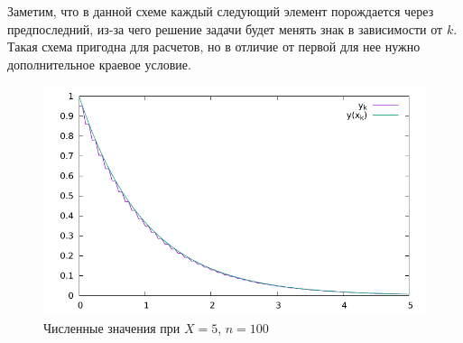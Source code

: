 \begin{example}
\begin{enumerate}
          Заметим, что в данной схеме каждый следующий элемент порождается через предпоследний,
          из-за чего решение задачи будет менять знак в зависимости от $k$.
          Такая схема пригодна для расчетов, но в отличие от первой для нее нужно
          дополнительное краевое условие.
          \begin{figure}[h]
            \centering
            \includegraphics[scale=\SingleImageScale]{12/3Scheme.pdf}
            \caption{Численные значения при $X=5$, $n=100$}
          \end{figure}
  \end{enumerate}
\end{example}

